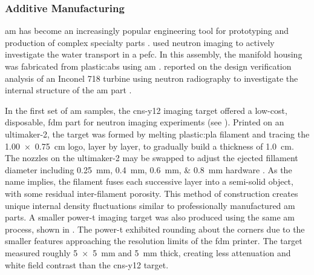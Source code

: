 \documentclass[../../../../main.tex]{subfiles}%
\begin{document}
%
    \subsubsection*{Additive Manufacturing}%
    \label{sec:chapter-3:beamline-testing:imaging-targets:additive-manufacturing}%
    \Gls{am} has become an increasingly popular engineering tool for prototyping and production of complex specialty parts \cite{Thompson_2016}.
    \citeauthor*{Santamaria_2015} used neutron imaging to actively investigate the water transport in a \gls{pefc}.
    In this assembly, the manifold housing was fabricated from \gls{plastic:abs} using \gls{am} \cite{Santamaria_2015}.
    \citeauthor*{Bilheux_2016} reported on the design verification analysis of an Inconel 718 turbine using neutron radiography to investigate the internal structure of the \gls{am} part \cite{Bilheux_2016}. 
    \par%
    In the first set of \gls{am} samples, the \gls{cns-y12} imaging target offered a low-cost, disposable, \gls{fdm} part for neutron imaging experiments (see ).
    Printed on an \gls{ultimaker-2}, the target was formed by melting \gls{plastic:pla} filament and tracing the \SI{1.00 x 0.75}{\centi\meter} logo, layer by layer, to gradually build a thickness of \SI{1.0}{\centi\meter}.
    The nozzles on the \gls{ultimaker-2} may be swapped to adjust the ejected fillament diameter including \SIlist[list-units=single]{0.25;0.4;0.6;0.8}{\milli\meter} hardware \cite{website:Ultimaker}.
    As the name implies, the filament fuses each successive layer into a semi-solid object, with some residual inter-filament porosity.
    This method of construction creates unique internal density fluctuations similar to professionally manufactured \gls{am} parts.
    A smaller \gls{power-t} imaging target was also produced using the same \gls{am} process, shown in .
    The \gls{power-t} exhibited rounding about the corners due to the smaller features approaching the resolution limits of the \gls{fdm} printer.
    The target measured roughly \SI[product-units=power]{5 x 5}{\milli\meter} and \SI{5}{\milli\meter} thick, creating less attenuation and white field contrast than the \gls{cns-y12} target.
\end{document}
